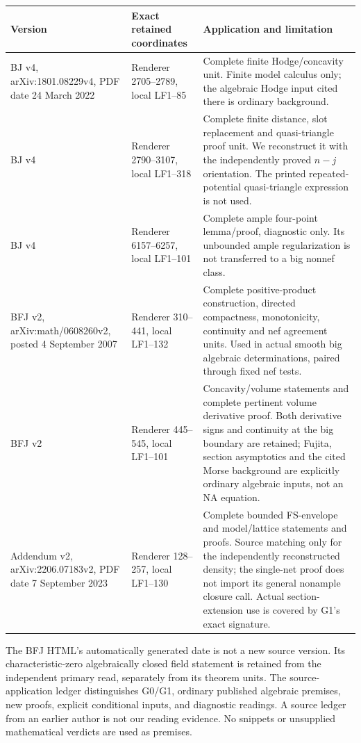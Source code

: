 \documentclass[10pt]{article}
\begin{document}
\begin{longtable}{p{.16\linewidth}p{.24\linewidth}p{.51\linewidth}}
Version & Exact retained coordinates & Application and limitation\\\hline
BJ v4, arXiv:\allowbreak 1801.08229v4, PDF date 24 March 2022 &
Renderer 2705--2789, local LF1--85 &
Complete finite Hodge/concavity unit. Finite model calculus only;
the algebraic Hodge input cited there is ordinary background.\\
BJ v4 & Renderer 2790--3107, local LF1--318 &
Complete finite distance, slot replacement and quasi-triangle proof unit.
We reconstruct it with the independently proved $n-j$ orientation.
The printed repeated-potential quasi-triangle expression is not used.\\
BJ v4 & Renderer 6157--6257, local LF1--101 &
Complete ample four-point lemma/proof, diagnostic only. Its unbounded
ample regularization is not transferred to a big nonnef class.\\
BFJ v2, arXiv:\allowbreak math/\allowbreak 0608260v2, posted 4 September 2007 &
Renderer 310--441, local LF1--132 &
Complete positive-product construction, directed compactness, monotonicity,
continuity and nef agreement units. Used in actual smooth big algebraic
determinations, paired through fixed nef tests.\\
BFJ v2 & Renderer 445--545, local LF1--101 &
Concavity/volume statements and complete pertinent volume derivative proof.
Both derivative signs and continuity at the big boundary are retained;
Fujita, section asymptotics and the cited Morse background are explicitly
ordinary algebraic inputs, not an NA equation.\\
Addendum v2, arXiv:\allowbreak 2206.07183v2, PDF date 7 September 2023 &
Renderer 128--257, local LF1--130 &
Complete bounded FS-envelope and model/lattice statements and proofs.
Source matching only for the independently reconstructed density; the
single-net proof does not import its general nonample closure call.
Actual section-extension use is covered by G1's exact signature.\\
\end{longtable}

The BFJ HTML's automatically generated date is not a new source version.
Its characteristic-zero algebraically closed field statement is retained
from the independent primary read, separately from its theorem units.
The source-application ledger distinguishes G0/G1, ordinary published
algebraic premises, new proofs, explicit conditional inputs, and diagnostic
readings. A source ledger from an earlier author is not our reading evidence.
No snippets or unsupplied mathematical verdicts are used as premises.
\end{document}
